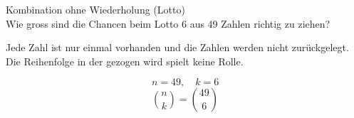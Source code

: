 \begin{example}{Kombination ohne Wiederholung (Lotto)}\\
Wie gross sind die Chancen beim Lotto 6 aus 49 Zahlen richtig zu ziehen?

Jede Zahl ist nur einmal vorhanden und die Zahlen werden nicht zurückgelegt. Die Reihenfolge in der gezogen wird spielt keine Rolle.

$$n = 49, \quad k = 6$$
$$\binom{n}{k} = \binom{49}{6}$$
\end{example}

